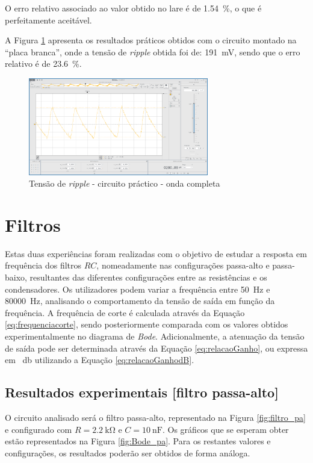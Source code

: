 O erro relativo associado ao valor obtido no \acrshort{lare} é de \SI{1.54}{\percent}, o que é perfeitamente aceitável.

A Figura \ref{fig:ripplepracticoondacompleta} apresenta os resultados práticos obtidos com o circuito montado na ``placa branca'', onde a tensão de \textit{ripple} obtida foi de: \SI{191}{\milli\volt}, sendo que o erro relativo é de \SI{23.6}{\percent}.

\begin{figure}[hbtp]
	\centering
	\includegraphics[width=0.7\textwidth]{figures/ripple_OC_placabranca.png}
	\caption{Tensão de \textit{ripple} - circuito práctico - onda completa}
	\label{fig:ripplepracticoondacompleta}
\end{figure}




\section{Filtros}
\label{sec:resultados_filtros}
Estas duas experiências foram realizadas com o objetivo de estudar a resposta em frequência dos filtros $RC$, nomeadamente nas configurações passa-alto e passa-baixo, resultantes das diferentes configurações entre as resistências e os condensadores. Os utilizadores podem variar a frequência entre \SI{50}{\hertz} e \SI{80000}{\hertz}, analisando o comportamento da tensão de saída em função da frequência. A frequência de corte é calculada através da Equação \ref{eq:frequenciacorte}, sendo posteriormente comparada com os valores obtidos experimentalmente no diagrama de \textit{Bode}. Adicionalmente, a atenuação da tensão de saída pode ser determinada através da Equação \ref{eq:relacaoGanho}, ou expressa em \SI{}{\decibel} utilizando a Equação \ref{eq:relacaoGanhodB}.

\subsection{Resultados experimentais [filtro passa-alto]}
\label{sec:resultados_filtros_passaalto}
O circuito analisado será o filtro passa-alto, representado na Figura \ref{fig:filtro_pa} e configurado com $R=\SI{2.2}{\kilo\ohm}$ e $C=\SI{10}{\nano\farad}$. Os gráficos que se esperam obter estão representados na Figura \ref{fig:Bode_pa}. Para os restantes valores e configurações, os resultados poderão ser obtidos de forma análoga.

